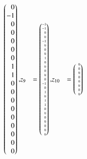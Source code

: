 \begin{beispiel}
\begin{align*}
\begin{pmatrix*}[r]
 0\\
-1\\
 0\\
 0\\
 0\\
 0\\
 0\\
 1\\
 1\\
 0\\
 0\\
 0\\
 0\\
 0\\
 0\\
 0\\
 0\\
 0
\end{pmatrix*},
&z_9 %
&=
\tiny
\begin{pmatrix*}[r]
-1\\
-1\\
 0\\
 0\\
-1\\
 0\\
 0\\
 0\\
 1\\
 0\\
 0\\
 0\\
 0\\
 0\\
-1\\
 0\\
 1\\
 0\\
 1\\
 1\\
 0\\
 0\\
 0\\
 0\\
 0\\
 0\\
 0
\end{pmatrix*},
&z_{10} %
&=
\tiny
\begin{pmatrix*}[r]
\phantom{-}
 0\\
 0\\
 0\\
 0\\
 0\\ %
 0\\ 
 0\\
 0\\

\end{pmatrix*}
\end{align*}
\end{beispiel}
